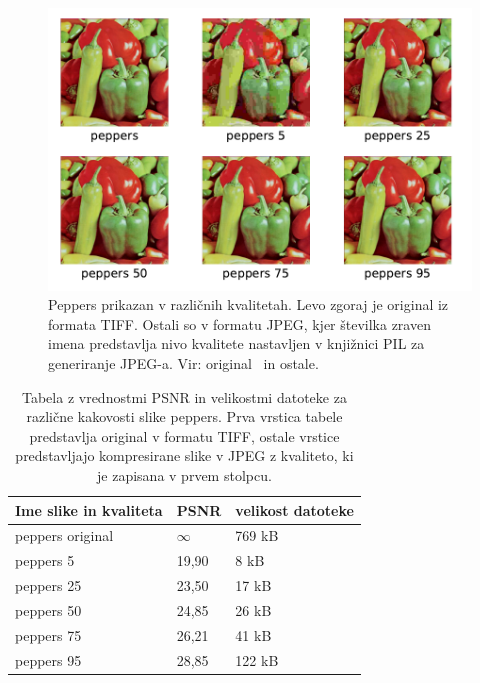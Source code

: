 \documentclass[a4paper,12pt,openright]{book}
\begin{document}
\begin{figure}[ht] %
\begin{center}
\includegraphics[width=1\textwidth]{slike/Quality_peppers.pdf}
\end{center}
\caption{Peppers prikazan v različnih kvalitetah. Levo zgoraj je original iz formata TIFF. Ostali so v formatu JPEG, kjer številka zraven imena predstavlja nivo kvalitete nastavljen v knjižnici PIL za generiranje JPEG-a. Vir: original~\cite{image_processing_slike} in ostale.}
\label{Quality_peppers}
\end{figure}

\begin{table}[ht]
\centering
    \begin{tabular}{|l|l|l|}
    \hline
    Ime slike in kvaliteta &PSNR   &velikost datoteke          \\
    \hline                   
    peppers original &$\infty$     & 769 kB                    \\ 
    peppers 5        & 19,90       & 8   kB                    \\
    peppers 25       & 23,50       & 17  kB                    \\  
    peppers 50       & 24,85       & 26  kB                    \\  
    peppers 75       & 26,21       & 41  kB                    \\  
    peppers 95       & 28,85       & 122 kB                    \\  
    \hline
    \end{tabular}
    \caption{Tabela z vrednostmi PSNR in velikostmi datoteke za različne kakovosti slike peppers. Prva vrstica tabele predstavlja original v formatu TIFF, ostale vrstice predstavljajo kompresirane slike v JPEG z kvaliteto, ki je zapisana v prvem stolpcu.}
\label{tab:peppers_psnr}
\end{table}
\end{document}
